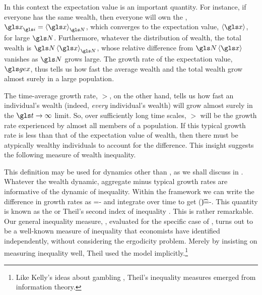 In this context the expectation value is an important quantity. 
For instance, if everyone has the same wealth, then everyone will own the \FEA, $\x_\gi=\ave{\x}_\N$, which converges to the expectation value, $\ave{\x}$, for large $\N$.
Furthermore, whatever the distribution of wealth, the total wealth is $\N\ave{\x}_\N$, whose relative difference from $\N\ave{\x}$ vanishes as $\N$ grows large.
The growth rate of the expectation value, $\gex$, thus tells us how fast the average wealth and the total wealth grow almost surely in a large population.

The time-average growth rate, $\gt$, on the other hand, tells us how fast an individual's wealth (indeed, \textit{every} individual's wealth) will grow almost surely in the $\t\to\infty$ limit.
So, over sufficiently long time scales, $\gt$ will be the growth rate experienced by almost all members of a population.
If this typical growth rate is less than that of the expectation value of wealth, then there must be atypically wealthy individuals to account for the difference. This insight suggests the following measure of wealth inequality.


This definition may be used for dynamics other than \GBM, as we shall discuss in . Whatever the wealth dynamic, aggregate minus typical growth rates are informative of the dynamic of inequality. Within the \GBM framework we can write the difference in growth rates as 
\be
\frac{\gd \J}{\gd\t}=\frac{\gd \ln \ave{\x}}{\gd\t}-\frac{\gd \ave{\ln \x}}{\gd\t}
\ee
and integrate over time to get
\be
\J(\t)=\ln \ave{\x(\t)}-\ave{\ln \x(\t)}.
\ee
This quantity is known as the \MLD or Theil's second index of inequality \cite{Theil1967}. This is rather remarkable. Our general inequality measure, , evaluated for the specific case of \GBM, turns out to be a well-known measure of inequality that economists have identified independently, without considering the ergodicity problem. Merely by insisting on measuring inequality well, Theil used the \GBM model implicitly.\footnote{Like Kelly's ideas about gambling \cite{Kelly1956}, Theil's inequality measures emerged from information theory.}

